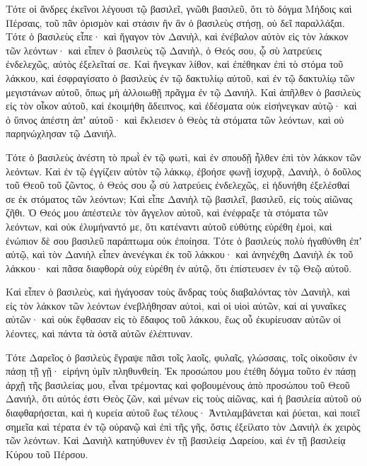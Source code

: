 {\par }{\PP {}Τότε οἱ ἄνδρες ἐκεῖνοι λέγουσι τῷ βασιλεῖ, γνῶθι βασιλεῦ, ὅτι τὸ δόγμα Μήδοις καὶ Πέρσαις, τοῦ πᾶν ὁρισμὸν καὶ στάσιν ἣν ἂν ὁ βασιλεὺς στήσῃ, οὐ δεῖ παραλλάξαι.
Τότε ὁ βασιλεὺς εἶπε· καὶ ἤγαγον τὸν Δανιὴλ, καὶ ἐνέβαλον αὐτὸν εἰς τὸν λάκκον τῶν λεόντων· καὶ εἶπεν ὁ βασιλεὺς τῷ Δανιὴλ, ὁ Θεός σου, ᾧ σὺ λατρεύεις ἐνδελεχῶς, αὐτὸς ἐξελεῖταί σε.
Καὶ ἤνεγκαν λίθον, καὶ ἐπέθηκαν ἐπὶ τὸ στόμα τοῦ λάκκου, καὶ ἐσφραγίσατο ὁ βασιλεὺς ἐν τῷ δακτυλίῳ αὐτοῦ, καὶ ἐν τῷ δακτυλίῳ τῶν μεγιστάνων αὐτοῦ, ὅπως μὴ ἀλλοιωθῇ πρᾶγμα ἐν τῷ Δανιήλ.
Καὶ ἀπῆλθεν ὁ βασιλεὺς εἰς τὸν οἶκον αὐτοῦ, καὶ ἐκοιμήθη ἄδειπνος, καὶ ἐδέσματα οὐκ εἰσήνεγκαν αὐτῷ· καὶ ὁ ὕπνος ἀπέστη ἀπʼ αὐτοῦ· καὶ ἔκλεισεν ὁ Θεὸς τὰ στόματα τῶν λεόντων, καὶ οὐ παρηνώχλησαν τῷ Δανιήλ.
\par }{\PP {}Τότε ὁ βασιλεὺς ἀνέστη τὸ πρωῒ ἐν τῷ φωτὶ, καὶ ἐν σπουδῇ ἦλθεν ἐπὶ τὸν λάκκον τῶν λεόντων.
Καὶ ἐν τῷ ἐγγίζειν αὐτὸν τῷ λάκκῳ, ἐβοήσε φωνῇ ἰσχυρᾷ, Δανιὴλ, ὁ δοῦλος τοῦ Θεοῦ τοῦ ζῶντος, ὁ Θεός σου ᾧ σὺ λατρεύεις ἐνδελεχῶς, εἰ ἠδυνήθη ἐξελέσθαί σε ἐκ στόματος τῶν λεόντων;
Καὶ εἶπε Δανιὴλ τῷ βασιλεῖ, βασιλεῦ, εἰς τοὺς αἰῶνας ζῆθι.
Ὁ Θεός μου ἀπέστειλε τὸν ἄγγελον αὐτοῦ, καὶ ἐνέφραξε τὰ στόματα τῶν λεόντων, καὶ οὐκ ἐλυμήναντό με, ὅτι κατέναντι αὐτοῦ εὐθύτης εὑρέθη ἐμοὶ, καὶ ἐνώπιον δὲ σου βασιλεῦ παράπτωμα οὐκ ἐποίησα.
Τότε ὁ βασιλεὺς πολὺ ἠγαθύνθη ἐπʼ αὐτῷ, καὶ τὸν Δανιὴλ εἶπεν ἀνενέγκαι ἐκ τοῦ λάκκου· καὶ ἀνηνέχθη Δανιὴλ ἐκ τοῦ λάκκου· καὶ πᾶσα διαφθορὰ οὐχ εὑρέθη ἐν αὐτῷ, ὅτι ἐπίστευσεν ἐν τῷ Θεῷ αὐτοῦ.
\par }{\PP {}Καὶ εἶπεν ὁ βασιλεὺς, καὶ ἠγάγοσαν τοὺς ἄνδρας τοὺς διαβαλόντας τὸν Δανιὴλ, καὶ εἰς τὸν λάκκον τῶν λεόντων ἐνεβλήθησαν αὐτοὶ, καὶ οἱ υἱοὶ αὐτῶν, καὶ αἱ γυναῖκες αὐτῶν· καὶ οὐκ ἔφθασαν εἰς τὸ ἔδαφος τοῦ λάκκου, ἕως οὗ ἐκυρίευσαν αὐτῶν οἱ λέοντες, καὶ πάντα τὰ ὀστᾶ αὐτῶν ἐλέπτυναν.
\par }{\PP {}Τότε Δαρεῖος ὁ βασιλεὺς ἔγραψε πᾶσι τοῖς λαοῖς, φυλαῖς, γλώσσαις, τοῖς οἰκοῦσιν ἐν πάσῃ τῇ γῇ· εἰρήνη ὑμῖν πληθυνθείη.
Ἐκ προσώπου μου ἐτέθη δόγμα τοῦτο ἐν πάσῃ ἀρχῇ τῆς βασιλείας μου, εἶναι τρέμοντας καὶ φοβουμένους ἀπὸ προσώπου τοῦ Θεοῦ Δανιήλ, ὅτι αὐτός ἐστι Θεὸς ζῶν, καὶ μένων εἰς τοὺς αἰῶνας, καὶ ἡ βασιλεία αὐτοῦ οὐ διαφθαρήσεται, καὶ ἡ κυρεία αὐτοῦ ἕως τέλους·
Ἀντιλαμβάνεται καὶ ῥύεται, καὶ ποιεῖ σημεῖα καὶ τέρατα ἐν τῷ οὐρανῷ καὶ ἐπὶ τῆς γῆς, ὅστις ἐξείλατο τὸν Δανιὴλ ἐκ χειρὸς τῶν λεόντων.
Καὶ Δανιὴλ κατηύθυνεν ἐν τῇ βασιλείᾳ Δαρείου, καὶ ἐν τῇ βασιλείᾳ Κύρου τοῦ Πέρσου.

}
